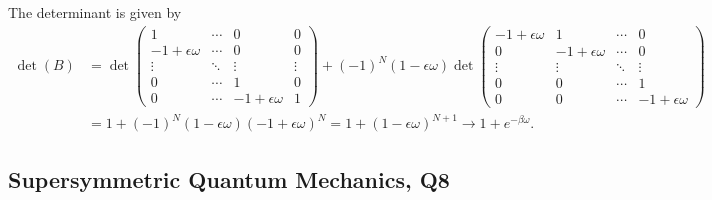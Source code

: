\begin{solution}
    The determinant is given by
    \begin{equation}
    \begin{aligned}
                \det(B) &= \det\begin{pmatrix}
    1 & \cdots & 0 & 0\\
        -1+\epsilon\omega & \cdots & 0 & 0\\
         \vdots & \ddots & \vdots & \vdots\\
         0 & \cdots & 1 & 0\\
         0 & \cdots & -1+\epsilon\omega & 1
        \end{pmatrix} + (-1)^N(1-\epsilon\omega)\det\begin{pmatrix}
        
        -1+\epsilon\omega & 1 & \cdots & 0 \\
        0 & -1+\epsilon\omega & \cdots & 0 \\
        \vdots & \vdots & \ddots & \vdots \\
        0 & 0 & \cdots & 1 \\
        0 & 0 & \cdots & -1+\epsilon\omega 
    \end{pmatrix}\\
    &= 1 + (-1)^N (1-\epsilon\omega)(-1+\epsilon\omega)^N = 1 + (1-\epsilon\omega)^{N+1} \to 1 + e^{-\beta\omega}.
    \end{aligned}
    \end{equation}
\end{solution}

\subsection{Supersymmetric Quantum Mechanics, Q8}

